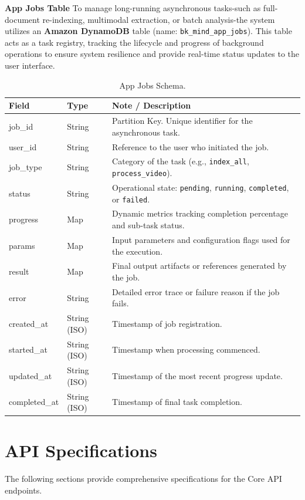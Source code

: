 \newpage

\textbf{App Jobs Table}
To manage long-running asynchronous tasks-such as full-document re-indexing, multimodal extraction, or batch analysis-the system utilizes an \textbf{Amazon DynamoDB} table (name: \texttt{bk\_mind\_app\_jobs}). This table acts as a task registry, tracking the lifecycle and progress of background operations to ensure system resilience and provide real-time status updates to the user interface.

\begin{table}[H]
    \centering
    \caption{App Jobs Schema.}
    \label{tab:app_jobs}
    \begin{tabular}{llp{8cm}}
        \toprule
        \textbf{Field} & \textbf{Type} & \textbf{Note / Description} \\
        \midrule
        job\_id & String & Partition Key. Unique identifier for the asynchronous task. \\
        \midrule
        user\_id & String & Reference to the user who initiated the job. \\
        job\_type & String & Category of the task (e.g., \texttt{index\_all}, \texttt{process\_video}). \\
        status & String & Operational state: \texttt{pending}, \texttt{running}, \texttt{completed}, or \texttt{failed}. \\
        progress & Map & Dynamic metrics tracking completion percentage and sub-task status. \\
        params & Map & Input parameters and configuration flags used for the execution. \\
        result & Map & Final output artifacts or references generated by the job. \\
        error & String & Detailed error trace or failure reason if the job fails. \\
        created\_at & String (ISO) & Timestamp of job registration. \\
        started\_at & String (ISO) & Timestamp when processing commenced. \\
        updated\_at & String (ISO) & Timestamp of the most recent progress update. \\
        completed\_at & String (ISO) & Timestamp of final task completion. \\
        \bottomrule
    \end{tabular}
\end{table}

\chapter{API Specifications}\label{chap:api_specs}
The following sections provide comprehensive specifications for the Core API endpoints.

